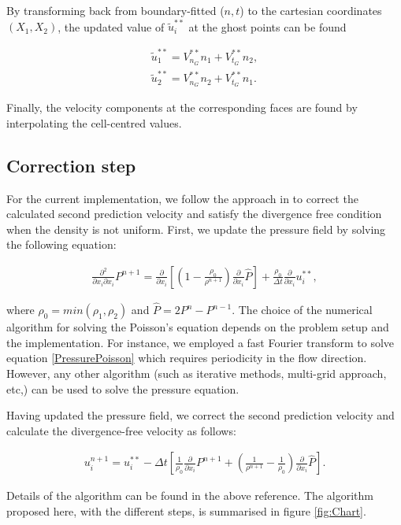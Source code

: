 \documentclass[review]{elsarticle}
\begin{document}
By transforming back from boundary-fitted ($n, t$) to the cartesian coordinates $(X_1, X_2)$, the updated value of $\tilde{u}^{**}_i$ at the ghost points can be found
\begin{linenomath}\begin{equation} \label{UpdateVandW}
\begin{gathered}
\tilde{u}^{**}_1 = V^{**}_{n_G} n_1+ V^{**}_{t_G} n_2,  \\
\tilde{u}^{**}_2 = V^{**}_{n_G} n_2+ V^{**}_{t_G} n_1. 
 \end{gathered}
\end{equation}\end{linenomath}
Finally, the velocity components at the corresponding faces are found by interpolating the cell-centred values.

\subsection{Correction step}
For the current implementation, we follow the approach in  \cite{DODD2014416} to correct the calculated second prediction velocity and satisfy the divergence free condition when the density is not uniform. First, we update the pressure field by  solving the following equation:
\begin{linenomath}\begin{equation} \label{PressurePoisson}
\begin{gathered}
\frac{\partial^2}{\partial x_i \partial x_i} P^{n+1} = \frac{\partial}{ \partial x_i} \left[(1-\frac{\rho_0}{\rho^{n+1}})  \frac{\partial}{\partial x_i} \hat{P} \right] + \frac{\rho_0}{\Delta t} \frac{\partial}{\partial x_i} {u^{**}_i},
 \end{gathered}
\end{equation}\end{linenomath}
where $\rho_0 = min(\rho_1,\rho_2)$ and $\hat{P} = 2P^n-P^{n-1}$.  The choice of the numerical algorithm for solving the Poisson's equation depends on the problem setup and the implementation. For instance, we employed a fast Fourier transform to solve equation \ref{PressurePoisson} which requires periodicity in the flow direction. However, any other algorithm (such as iterative methods, multi-grid approach, etc,) can be used to solve the pressure equation.

Having updated the pressure field, we correct the second prediction velocity and calculate the divergence-free velocity as follows:
\begin{linenomath}\begin{equation} \label{correction}
\begin{gathered}
u^{n+1}_i = u^{**}_i - \Delta t \left[\frac{1}{\rho_0} \frac{\partial}{\partial x_i}P^{n+1}  + \left(   \frac{1}{\rho^{n+1}}-  \frac{1}{\rho_0}\right)  \frac{\partial}{\partial x_i}\hat{P} \right].
 \end{gathered}
\end{equation}\end{linenomath}
Details of the algorithm can be found in the above reference.  The algorithm proposed here, with the different steps, is summarised in figure \ref{fig:Chart}.
\end{document}
